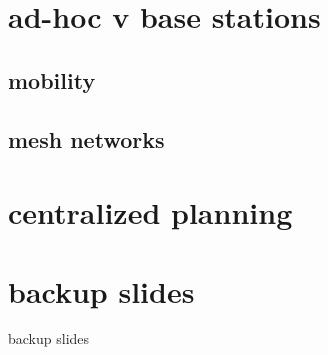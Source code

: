 \section{ad-hoc v base stations}


\subsection{mobility}


\subsection{mesh networks}


\section{centralized planning}




\section{backup slides}
\begin{frame}{backup slides}
\end{frame}


